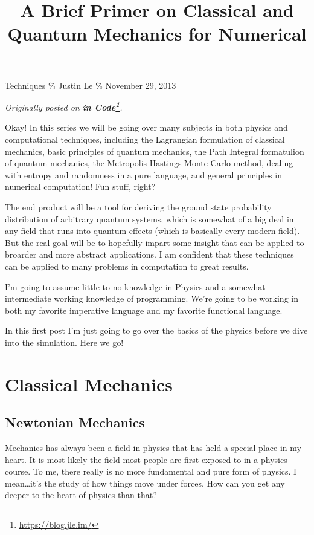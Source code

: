 \documentclass[]{article}
\title{A Brief Primer on Classical and Quantum Mechanics for Numerical}
\renewcommand{\href}[2]{#2\footnote{\url{#1}}}
\begin{document}
\maketitle

Techniques \% Justin Le \% November 29, 2013

\emph{Originally posted on \textbf{\href{https://blog.jle.im/}{in
Code}}.}

Okay! In this series we will be going over many subjects in both physics
and computational techniques, including the Lagrangian formulation of
classical mechanics, basic principles of quantum mechanics, the Path
Integral formatulion of quantum mechanics, the Metropolis-Hastings Monte
Carlo method, dealing with entropy and randomness in a pure language,
and general principles in numerical computation! Fun stuff, right?

The end product will be a tool for deriving the ground state probability
distribution of arbitrary quantum systems, which is somewhat of a big
deal in any field that runs into quantum effects (which is basically
every modern field). But the real goal will be to hopefully impart some
insight that can be applied to broarder and more abstract applications.
I am confident that these techniques can be applied to many problems in
computation to great results.

I'm going to assume little to no knowledge in Physics and a somewhat
intermediate working knowledge of programming. We're going to be working
in both my favorite imperative language and my favorite functional
language.

In this first post I'm just going to go over the basics of the physics
before we dive into the simulation. Here we go!

\section{Classical Mechanics}\label{classical-mechanics}

\subsection{Newtonian Mechanics}\label{newtonian-mechanics}

Mechanics has always been a field in physics that has held a special
place in my heart. It is most likely the field most people are first
exposed to in a physics course. To me, there really is no more
fundamental and pure form of physics. I mean\ldots{}it's the study of
how things move under forces. How can you get any deeper to the heart of
physics than that?
\end{document}
